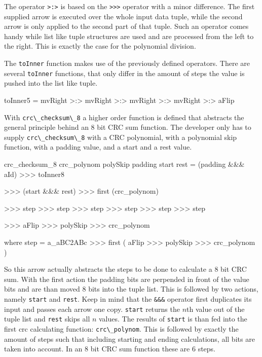 \documentclass[9pt,final,a4paper,leqno]{article}
\newcommand{\hs}[1]{\mbox{\lstinline[basicstyle=\color{textgray}]!#1!}}
\begin{document}
The operator \hs{>:>} is based on the \hs{>>>} operator with a minor difference. The first supplied arrow is executed over the whole input
data tuple, while the second arrow is only applied to the second part of that tuple. Such an operator comes handy while list like tuple
structures are used and are processed from the left to the right. This is exactly the case for the polynomial division. 


\par
The \hs{toInner} function makes use of the previously defined operators. There are several \hs{toInner} functions, that only differ in the
amount of steps the value is pushed into the list like tuple.
\begin{haskell}
toInner5
  =   mvRight
  >:> mvRight
  >:> mvRight
  >:> mvRight
  >:> aFlip
\end{haskell} 


\par
With \hs{crc\_checksum\_8} a higher order function is defined that abstracts the general principle behind an 8 bit CRC sum function. The
developer only has to supply \hs{crc\_checksum\_8} with a CRC polynomial, with a polynomial skip function, with a padding value, and a start
and a rest value. 
\begin{haskell}
crc_checksum_8 crc_polynom polySkip padding start rest
  =   (padding &&& aId)
  >>> toInner8

  >>> (start &&& rest)
  >>> first (crc_polynom)

  >>> step
  >>> step
  >>> step
  >>> step
  >>> step
  >>> step

  >>> aFlip
  >>> polySkip
  >>> crc_polynom

  where step =   a_aBC2ABc
             >>> first 
                 (   aFlip
                 >>> polySkip
                 >>> crc_polynom
                 )   
\end{haskell} 

So this arrow actually abstracts the steps to be done to calculate a 8 bit CRC sum. With the first action the padding bits are perpended in
front of the value bits and are than moved 8 bits into the tuple list. This is followed by two actions, namely \hs{start} and \hs{rest}.
Keep in mind that the \hs{&&&} operator first duplicates its input and passes each arrow one copy. \hs{start} returns the $n$th value out
of the tuple list and \hs{rest} skips all $n$ values. The results of \hs{start} is than fed into the first crc calculating function:
\hs{crc\_polynom}. This is followed by exactly the amount of steps such that including starting and ending calculations, all bits are taken
into account. In an $8$ bit CRC sum function these are $6$ steps. 
\end{document}
